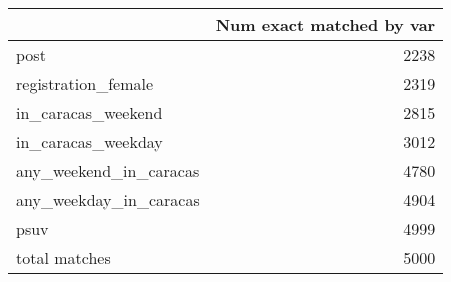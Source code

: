 \begin{tabular}{lr}
\toprule
{} &  Num exact matched by var \\
\midrule
post                   &                      2238 \\
registration\_female    &                      2319 \\
in\_caracas\_weekend     &                      2815 \\
in\_caracas\_weekday     &                      3012 \\
any\_weekend\_in\_caracas &                      4780 \\
any\_weekday\_in\_caracas &                      4904 \\
psuv                   &                      4999 \\
total matches          &                      5000 \\
\bottomrule
\end{tabular}
